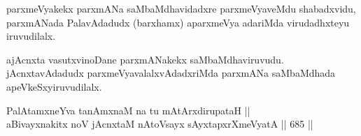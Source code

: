 \begin{artha} 
parxmeVyakekx parxmANa saMbaMdhavidadxre parxmeVyaveMdu shabadxvidu, parxmANada PalavAdadudx (barxhamx) aparxmeVya adariMda virudadhxteyu iruvudilalx.

ajAcnxta vasutxvinoDane parxmANakekx saMbaMdhaviruvudu. jAcnxtavAdadudx parxmeVyavalalxvAdadxriMda parxmANa saMbaMdhada apeVkeSxyiruvudilalx.
\end{artha}


\begin{shl}
PalAtamxneYva tanAmxnaM na tu mAtArxdirupataH || \\
aBivayxnakitx noV jAcnxtaM nAtoV\s sayx sAyxtapxrXmeVyatA \hfill || 685 ||  
\end{shl}

